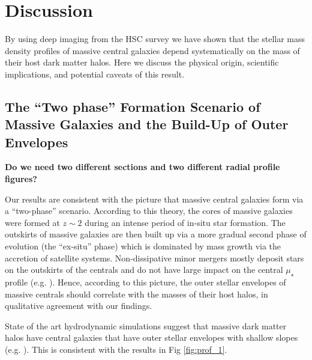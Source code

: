 \documentclass[a4paper,fleqn,usenatbib]{mnras}
\def\mden{{$\mu_{\star}$}}
\begin{document}
\section{Discussion}
    \label{sec:discussion}
    
    By using deep imaging from the HSC survey we have shown that the stellar mass 
    density profiles of massive central galaxies depend systematically on the mass 
    of their host dark matter halos. 
    Here we discuss the physical origin, scientific implications, and potential 
    caveats of this result. 
    
    
\subsection{The ``Two phase'' Formation Scenario of Massive Galaxies and the 
            Build-Up of Outer Envelopes}
    \label{ssec:twophase}

    {\bf Do we need two different sections and two different radial profile figures?}
            
    Our results are consistent with the picture that massive central galaxies form via 
    a ``two-phase'' scenario. 
    According to this theory, the cores of massive galaxies were formed at $z{\sim} 2$ 
    during an intense period of in-situ star formation. 
    The outskirts of massive galaxies are then built up via a more gradual second 
    phase of evolution (the ``ex-situ'' phase) which is dominated by mass growth via 
    the accretion of satellite systems. 
    Non-dissipative minor mergers mostly deposit stars on the outskirts of the 
    centrals and do not have large impact on the central \mden{} profile 
    (e.g. \citealt{Oogi2013, Bedorf2013}). 
    Hence, according to this picture, the outer stellar envelopes of massive centrals 
    should correlate with the masses of their host halos, in qualitative agreement with
    our findings. 
          
    State of the art hydrodynamic simulations suggest that massive dark matter halos 
    have central galaxies that have outer stellar envelopes with shallow slopes 
    (e.g. \citealt{Pillepich2014}). 
    This is consistent with the results in Fig \ref{fig:prof_1}.
     
\end{document}
